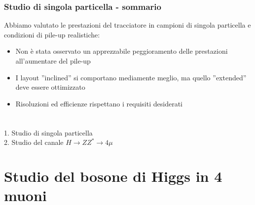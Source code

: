 \documentclass{beamer}
\begin{document}
\begin{frame}
\frametitle{Studio di singola particella - sommario}
Abbiamo valutato le prestazioni del tracciatore in campioni di singola
particella e condizioni di pile-up realistiche:
\begin{itemize}
\item Non \`e stata osservato un apprezzabile peggioramento delle prestazioni
all'aumentare del pile-up
\item I layout ''inclined'' si comportano mediamente meglio, ma quello 
''extended'' deve essere ottimizzato
\item Risoluzioni ed efficienze rispettano i requisiti desiderati
\end{itemize}

\end{frame}

\section{}
\begin{frame}


\Large{\color{gray}1. Studio di singola particella}\\
\bigskip
\bigskip
\bigskip
\Large{\color{dred}2. Studio del canale $H \rightarrow ZZ^{*} \rightarrow 4\mu$}

\end{frame}


\section{Studio del bosone di Higgs in 4 muoni}
\end{document}
